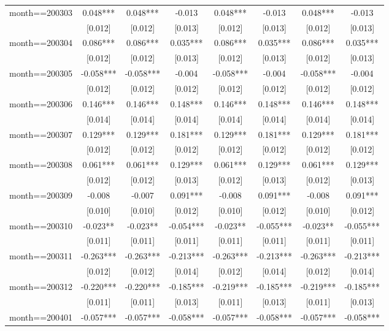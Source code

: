 \documentclass[]{article}
\begin{document}
\begin{tabular}{lccccccc}
month==200303 & 0.048*** & 0.048*** & -0.013 & 0.048*** & -0.013 & 0.048*** & -0.013 \\
 & [0.012] & [0.012] & [0.013] & [0.012] & [0.013] & [0.012] & [0.013] \\
month==200304 & 0.086*** & 0.086*** & 0.035*** & 0.086*** & 0.035*** & 0.086*** & 0.035*** \\
 & [0.012] & [0.012] & [0.013] & [0.012] & [0.013] & [0.012] & [0.013] \\
month==200305 & -0.058*** & -0.058*** & -0.004 & -0.058*** & -0.004 & -0.058*** & -0.004 \\
 & [0.012] & [0.012] & [0.012] & [0.012] & [0.012] & [0.012] & [0.012] \\
month==200306 & 0.146*** & 0.146*** & 0.148*** & 0.146*** & 0.148*** & 0.146*** & 0.148*** \\
 & [0.014] & [0.014] & [0.014] & [0.014] & [0.014] & [0.014] & [0.014] \\
month==200307 & 0.129*** & 0.129*** & 0.181*** & 0.129*** & 0.181*** & 0.129*** & 0.181*** \\
 & [0.012] & [0.012] & [0.012] & [0.012] & [0.012] & [0.012] & [0.012] \\
month==200308 & 0.061*** & 0.061*** & 0.129*** & 0.061*** & 0.129*** & 0.061*** & 0.129*** \\
 & [0.012] & [0.012] & [0.013] & [0.012] & [0.013] & [0.012] & [0.013] \\
month==200309 & -0.008 & -0.007 & 0.091*** & -0.008 & 0.091*** & -0.008 & 0.091*** \\
 & [0.010] & [0.010] & [0.012] & [0.010] & [0.012] & [0.010] & [0.012] \\
month==200310 & -0.023** & -0.023** & -0.054*** & -0.023** & -0.055*** & -0.023** & -0.055*** \\
 & [0.011] & [0.011] & [0.011] & [0.011] & [0.011] & [0.011] & [0.011] \\
month==200311 & -0.263*** & -0.263*** & -0.213*** & -0.263*** & -0.213*** & -0.263*** & -0.213*** \\
 & [0.012] & [0.012] & [0.014] & [0.012] & [0.014] & [0.012] & [0.014] \\
month==200312 & -0.220*** & -0.220*** & -0.185*** & -0.219*** & -0.185*** & -0.219*** & -0.185*** \\
 & [0.011] & [0.011] & [0.013] & [0.011] & [0.013] & [0.011] & [0.013] \\
month==200401 & -0.057*** & -0.057*** & -0.058*** & -0.057*** & -0.058*** & -0.057*** & -0.058*** \\

\end{tabular}
\end{document}

